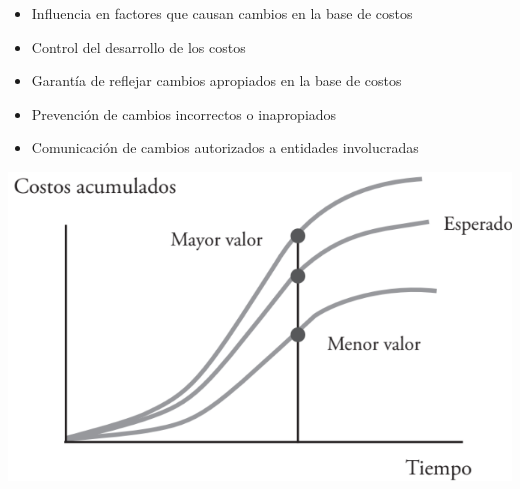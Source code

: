 \documentclass{article} %
\begin{document}
\begin{minipage}{0.45\textwidth}
    \begin{itemize}
    \item Influencia en factores que causan cambios en la base de costos
    \item Control del desarrollo de los costos
    \item Garantía de reflejar cambios apropiados en la base de costos
    \item Prevención de cambios incorrectos o inapropiados
    \item Comunicación de cambios autorizados a entidades involucradas
    \end{itemize}
\end{minipage}
\hfill
\begin{minipage}{0.5\textwidth}
    \centering
    \includegraphics[width=\textwidth]{curva_s.png}
\end{minipage}
\end{document}
